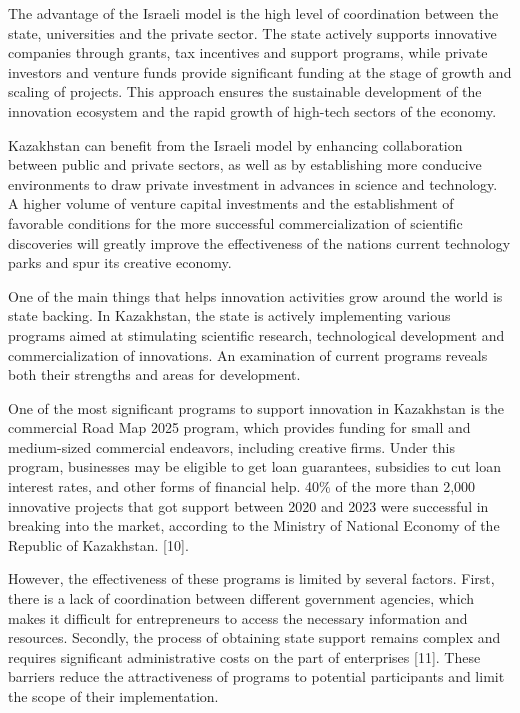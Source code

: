 The advantage of the Israeli model is the high level of coordination
between the state, universities and the private sector. The state
actively supports innovative companies through grants, tax incentives
and support programs, while private investors and venture funds provide
significant funding at the stage of growth and scaling of projects. This
approach ensures the sustainable development of the innovation ecosystem
and the rapid growth of high-tech sectors of the economy.

Kazakhstan can benefit from the Israeli model by enhancing collaboration
between public and private sectors, as well as by establishing more
conducive environments to draw private investment in advances in science
and technology. A higher volume of venture capital investments and the
establishment of favorable conditions for the more successful
commercialization of scientific discoveries will greatly improve the
effectiveness of the nation\textquotesingle s current technology parks
and spur its creative economy.

One of the main things that helps innovation activities grow around the
world is state backing. In Kazakhstan, the state is actively
implementing various programs aimed at stimulating scientific research,
technological development and commercialization of innovations. An
examination of current programs reveals both their strengths and areas
for development.

One of the most significant programs to support innovation in Kazakhstan
is the commercial Road Map 2025 program, which provides funding for
small and medium-sized commercial endeavors, including creative firms.
Under this program, businesses may be eligible to get loan guarantees,
subsidies to cut loan interest rates, and other forms of financial help.
40\% of the more than 2,000 innovative projects that got support between
2020 and 2023 were successful in breaking into the market, according to
the Ministry of National Economy of the Republic of Kazakhstan.
{[}10{]}.

However, the effectiveness of these programs is limited by several
factors. First, there is a lack of coordination between different
government agencies, which makes it difficult for entrepreneurs to
access the necessary information and resources. Secondly, the process of
obtaining state support remains complex and requires significant
administrative costs on the part of enterprises {[}11{]}. These barriers
reduce the attractiveness of programs to potential participants and
limit the scope of their implementation.

